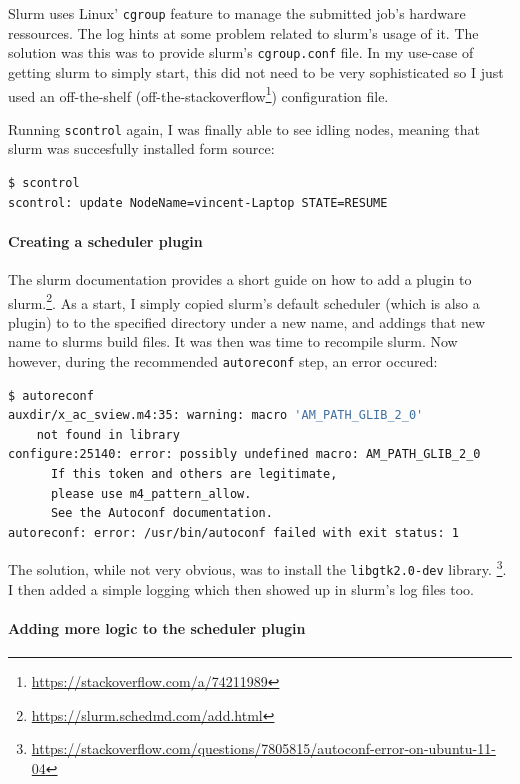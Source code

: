 Slurm uses Linux' \verb|cgroup| feature to manage the submitted job's hardware ressources. The log hints at some problem related to slurm's usage of it.
The solution was this was to provide slurm's \verb|cgroup.conf| file. In my use-case of getting slurm to simply start, this did not need to be very sophisticated so I just used an off-the-shelf (off-the-stackoverflow\footnote{\url{https://stackoverflow.com/a/74211989}}) configuration file.

Running \verb|scontrol| again, I was finally able to see idling nodes, meaning that slurm was succesfully installed form source:

\begin{lstlisting}[language=bash, frame=single, numbers=none, caption={Slurm running}, basicstyle=\ttfamily]
$ scontrol
scontrol: update NodeName=vincent-Laptop STATE=RESUME
\end{lstlisting}

\paragraph{Creating a scheduler plugin}

The slurm documentation provides a short guide on how to add a plugin to slurm.\footnote{\url{https://slurm.schedmd.com/add.html}}. 
As a start, I simply copied slurm's default scheduler (which is also a plugin) to to the specified directory under a new name, and addings that new name to slurms build files. 
It was then was time to recompile slurm. 
Now however, during the recommended \verb|autoreconf| step, an error occured:

\begin{lstlisting}[language=bash, frame=single, numbers=none, caption={Plugin recompilation errors}, basicstyle=\ttfamily]
$ autoreconf
auxdir/x_ac_sview.m4:35: warning: macro 'AM_PATH_GLIB_2_0' 
    not found in library
configure:25140: error: possibly undefined macro: AM_PATH_GLIB_2_0
      If this token and others are legitimate, 
      please use m4_pattern_allow.
      See the Autoconf documentation.
autoreconf: error: /usr/bin/autoconf failed with exit status: 1
\end{lstlisting}

The solution, while not very obvious, was to install the \verb|libgtk2.0-dev| library. \footnote{\url{https://stackoverflow.com/questions/7805815/autoconf-error-on-ubuntu-11-04}}. 
I then added a simple logging which then showed up in slurm's log files too.

\paragraph{Adding more logic to the scheduler plugin}

